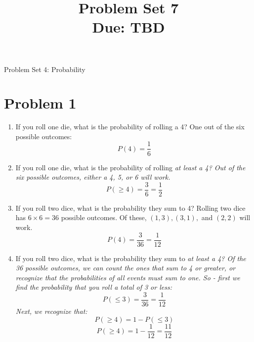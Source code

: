 \documentclass[11pt]{article}
\title{Problem Set 7\\ Due: TBD}%
\theoremstyle{definition}
\theoremstyle{remark}
\begin{document}
\begin{center}
{\huge Problem Set 4: Probability}\\[5pt]
\end{center}

\section*{Problem 1}
\begin{enumerate}
\item If you roll one die, what is the probability of rolling a 4?
{\color{red} One out of the six possible outcomes:
$$ P(4) = \frac{1}{6} $$} 
\item If you roll one die, what is the probability of rolling \em at least \em a 4?
{\color{red} Out of the six possible outcomes, either a 4, 5, or 6 will work.
$$ P(\geq 4) = \frac{3}{6} = \frac{1}{2} $$}
\item If you roll two dice, what is the probability they sum to 4?
{\color{red} Rolling two dice has $6 \times 6 = 36$ possible outcomes. Of these, $(1, 3), (3,1),$ and $(2,2)$ will work.
$$ P(4) = \frac{3}{36} = \frac{1}{12} $$}
\item If you roll two dice, what is the probability they sum to \em at least \em a 4?
{\color{red} Of the 36 possible outcomes, we can count the ones that sum to 4 or greater, or recognize that the probabilities of all events must sum to one. So - first we find the probability that you roll a total of 3 or less:
$$ P(\leq 3) = \frac{3}{36} = \frac{1}{12} $$
Next, we recognize that:
$$ P(\geq 4) = 1 - P(\leq 3) $$
$$ P(\geq 4) = 1 - \frac{1}{12} = \frac{11}{12} $$
}
\end{enumerate}
\end{document}
